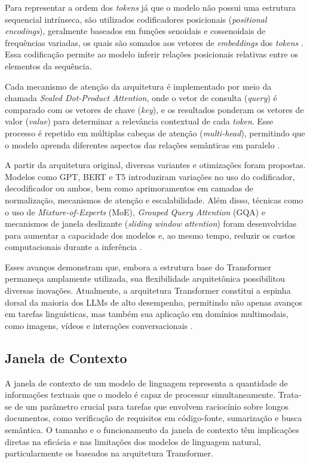 Para representar a ordem dos \textit{tokens} já que o modelo não possui uma estrutura sequencial intrínseca, são utilizados codificadores posicionais (\textit{positional encodings}), geralmente baseados em funções senoidais e cossenoidais de frequências variadas, os quais são somados aos vetores de \textit{embeddings} dos \textit{tokens} . Essa codificação permite ao modelo inferir relações posicionais relativas entre os elementos da sequência.

Cada mecanismo de atenção da arquitetura é implementado por meio da chamada \textit{Scaled Dot-Product Attention}, onde o vetor de consulta (\textit{query}) é comparado com os vetores de chave (\textit{key}), e os resultados ponderam os vetores de valor (\textit{value}) para determinar a relevância contextual de cada \textit{token}. Esse processo é repetido em múltiplas cabeças de atenção (\textit{multi-head}), permitindo que o modelo aprenda diferentes aspectos das relações semânticas em paralelo \cite{ankit2024transformer, raschka2025bigllm}.

A partir da arquitetura original, diversas variantes e otimizações foram propostas. Modelos como GPT, BERT e T5 introduziram variações no uso do codificador, decodificador ou ambos, bem como aprimoramentos em camadas de normalização, mecanismos de atenção e escalabilidade. Além disso, técnicas como o uso de \textit{Mixture-of-Experts} (MoE), \textit{Grouped Query Attention} (GQA) e mecanismos de janela deslizante (\textit{sliding window attention}) foram desenvolvidas para aumentar a capacidade dos modelos e, ao mesmo tempo, reduzir os custos computacionais durante a inferência .

Esses avanços demonstram que, embora a estrutura base do Transformer permaneça amplamente utilizada, sua flexibilidade arquitetônica possibilitou diversas inovações. Atualmente, a arquitetura Transformer constitui a espinha dorsal da maioria dos LLMs de alto desempenho, permitindo não apenas avanços em tarefas linguísticas, mas também sua aplicação em domínios multimodais, como imagens, vídeos e interações conversacionais \cite{ankit2024transformer, raschka2025bigllm}.


\subsection{Janela de Contexto}

A janela de contexto de um modelo de linguagem representa a quantidade de informações textuais que o modelo é capaz de processar simultaneamente. Trata-se de um parâmetro crucial para tarefas que envolvem raciocínio sobre longos documentos, como verificação de requisitos em código-fonte, sumarização e busca semântica. O tamanho e o funcionamento da janela de contexto têm implicações diretas na eficácia e nas limitações dos modelos de linguagem natural, particularmente os baseados na arquitetura Transformer.

